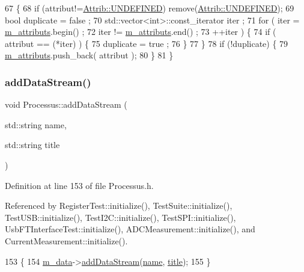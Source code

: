 \begin{DoxyCode}
67                             \{
68     \textcolor{keywordflow}{if} (attribut!=\hyperlink{classAttrib_a69e171d7cc6417835a5a306d3c764235a3a8da2ab97dda18aebab196fe4100531}{Attrib::UNDEFINED}) \textcolor{keyword}{remove}(\hyperlink{classAttrib_a69e171d7cc6417835a5a306d3c764235a3a8da2ab97dda18aebab196fe4100531}{Attrib::UNDEFINED});
69     \textcolor{keywordtype}{bool} duplicate = false ;
70     std::vector<int>::const\_iterator iter ;
71     \textcolor{keywordflow}{for} ( iter  = \hyperlink{classAttrib_ac4bd58a0cc6b38a3b711d609a3d3aacc}{m\_attributs}.begin() ;
72           iter != \hyperlink{classAttrib_ac4bd58a0cc6b38a3b711d609a3d3aacc}{m\_attributs}.end()   ;
73           ++iter ) \{
74       \textcolor{keywordflow}{if} ( attribut == (*iter) ) \{
75         duplicate = true ;
76       \}
77     \}
78     \textcolor{keywordflow}{if} (!duplicate) \{
79       \hyperlink{classAttrib_ac4bd58a0cc6b38a3b711d609a3d3aacc}{m\_attributs}.push\_back( attribut );
80     \}
81   \}
\end{DoxyCode}
\mbox{\label{classProcessus_a308c8f193802f1d1ab49d4447d0cb281}} 
\subsubsection{\texorpdfstring{add\+Data\+Stream()}{addDataStream()}}
{\footnotesize\ttfamily void Processus\+::add\+Data\+Stream (\begin{DoxyParamCaption}\item[{std\+::string}]{name,  }\item[{std\+::string}]{title }\end{DoxyParamCaption})\hspace{0.3cm}{\ttfamily [inline]}}



Definition at line 153 of file Processus.\+h.



Referenced by Register\+Test\+::initialize(), Test\+Suite\+::initialize(), Test\+U\+S\+B\+::initialize(), Test\+I2\+C\+::initialize(), Test\+S\+P\+I\+::initialize(), Usb\+F\+T\+Interface\+Test\+::initialize(), A\+D\+C\+Measurement\+::initialize(), and Current\+Measurement\+::initialize().


\begin{DoxyCode}
153                                                        \{
154     \hyperlink{classProcessus_a3da9a9de8af54e2f47807a3e09dfccff}{m\_data}->\hyperlink{classData_a33c31859f6b2771ebd4f0b83fa44739c}{addDataStream}(\hyperlink{classObject_a300f4c05dd468c7bb8b3c968868443c1}{name}, \hyperlink{classObject_a73a0f1a41828fdd8303dd662446fb6c3}{title});
155   \}
\end{DoxyCode}
\mbox{\label{classProcessus_ad46e0d4dfdfdcbce001ee6be1746dfa4}} 
